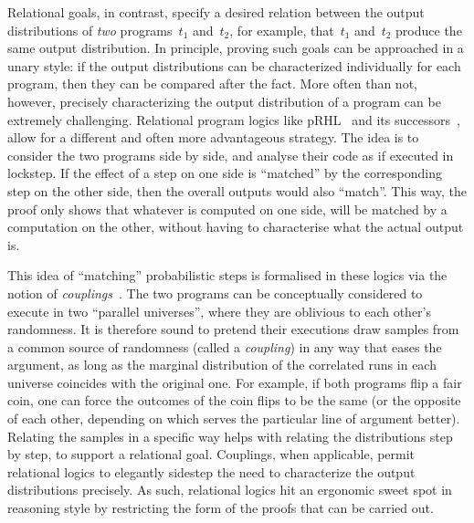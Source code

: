 Relational goals, in contrast, specify a desired relation between the output
distributions of \emph{two} programs~$t_1$ and~$t_2$,
for example, that~$t_1$ and~$t_2$ produce the same output distribution.
In principle, proving such goals can be approached in a unary style:
if the output distributions can be characterized
individually for each program,
then they can be compared after the fact.
More often than not, however,
precisely characterizing the output distribution of a program
can be extremely challenging.
Relational program logics like pRHL~\cite{barthe2009formal}
and its successors~\cite{barthe2009formal,barthe2015coupling,hsu2017probabilistic,gregersen2023asynchronous,AguirreBGGS19},
allow for a different and often more advantageous strategy.
The idea is to consider the two programs side by side,
and analyse their code as if executed in lockstep.
If the effect of a step on one side is ``matched'' by the corresponding
step on the other side,
then the overall outputs would also ``match''.
This way, the proof only shows that whatever is computed on one side,
will be matched by a computation on the other, without having to characterise
what the actual output is.

This idea of ``matching'' probabilistic steps is formalised in these logics
via the notion of \emph{couplings}~\cite{barthe2009formal,barthe2015coupling}.
The two programs can be conceptually considered to execute in
two ``parallel universes'', where they are oblivious to each other's randomness.
It is therefore sound to pretend their executions draw samples from
a common source of randomness (called a \emph{coupling})
in any way that eases the argument,
as long as the marginal distribution of the correlated runs in each universe
coincides with the original one.
For example, if both programs flip a fair coin,
one can force the outcomes of the coin flips to be the same
(or the opposite of each other,
depending on which serves the particular line of argument better).
Relating the samples in a specific way helps with
relating the distributions step by step, to support a relational goal.
Couplings, when applicable, permit relational logics to elegantly sidestep
the need to characterize the output distributions precisely.
As such, relational logics hit an ergonomic sweet spot in reasoning style
by restricting the form of the proofs that can be carried out.




